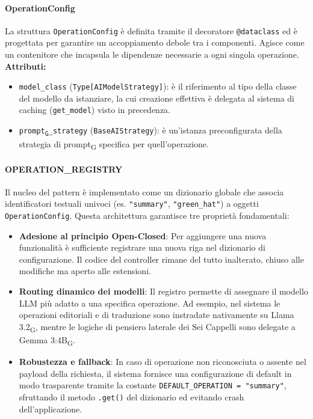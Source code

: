 \documentclass[11pt,a4paper]{article}
\newcommand{\gls}[1]{#1\textsubscript{G}}
\begin{document}
\paragraph{OperationConfig} 
La struttura \texttt{OperationConfig} è definita tramite il decoratore \texttt{@dataclass} ed è progettata per garantire un accoppiamento debole tra i componenti. Agisce come un contenitore che incapsula le dipendenze necessarie a ogni singola operazione.\\
\textbf{Attributi:}
\begin{itemize}
    \item \texttt{model\_class} (\texttt{Type[AIModelStrategy]}): è il riferimento al tipo della classe del modello da istanziare, la cui creazione effettiva è delegata al sistema di caching (\texttt{get\_model}) visto in precedenza.
    \item \texttt{\gls{prompt}\_strategy} (\texttt{BaseAIStrategy}): è un'istanza preconfigurata della strategia di \gls{prompt} specifica per quell'operazione.
\end{itemize}

\paragraph{OPERATION\_REGISTRY}
Il nucleo del pattern è implementato come un dizionario globale che associa identificatori testuali univoci (es. \texttt{"summary"}, \texttt{"green\_hat"}) a oggetti \texttt{OperationConfig}. Questa architettura garantisce tre proprietà fondamentali:
\begin{itemize}
    \item \textbf{Adesione al principio Open-Closed}: Per aggiungere una nuova funzionalità è sufficiente registrare una nuova riga nel dizionario di configurazione. Il codice del controller rimane del tutto inalterato, chiuso alle modifiche ma aperto alle estensioni.
    \item \textbf{Routing dinamico dei modelli}: Il registro permette di assegnare il modello LLM più adatto a una specifica operazione. Ad esempio, nel sistema le operazioni editoriali e di traduzione sono instradate nativamente su \gls{Llama 3.2}, mentre le logiche di pensiero laterale dei Sei Cappelli sono delegate a \gls{Gemma 3:4B}.
    \item \textbf{Robustezza e fallback}: In caso di operazione non riconosciuta o assente nel payload della richiesta, il sistema fornisce una configurazione di default in modo trasparente tramite la costante \texttt{DEFAULT\_OPERATION = "summary"}, sfruttando il metodo \texttt{.get()} del dizionario ed evitando crash dell'applicazione.
\end{itemize}
\end{document}
